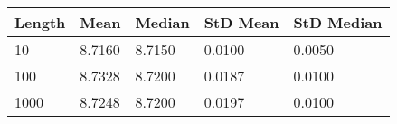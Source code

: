 
\begin{tabular}{lllll}

{\bf Length} & {\bf Mean} & {\bf Median} & 
  {\bf StD Mean} & {\bf StD Median} \\ \hline

10   & 8.7160 & 8.7150 & 0.0100 & 0.0050 \\
100  & 8.7328 & 8.7200 & 0.0187 & 0.0100 \\
1000 & 8.7248 & 8.7200 & 0.0197 & 0.0100 \\

\hline
\end{tabular}
